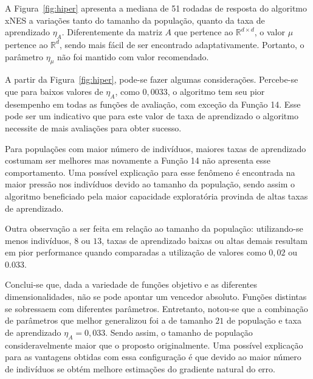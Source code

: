A Figura~\ref{fig:hiper} apresenta a mediana de 51 rodadas de resposta do algoritmo xNES a variações tanto do
tamanho da população, quanto da taxa de aprendizado $\eta_A$.
Diferentemente da matriz $A$ que pertence ao $\mathbb{R}^{d \times d}$, o valor $\mu$ pertence ao $\mathbb{R}^{d}$, sendo
mais fácil de ser encontrado adaptativamente.
Portanto, o parâmetro $\eta_{\mu}$ não foi mantido com valor recomendado.

A partir da Figura~\ref{fig:hiper}, pode-se fazer algumas considerações.
Percebe-se que para baixos valores de $\eta_A$, como $0,0033$, o algoritmo tem seu pior desempenho em todas as funções
de avaliação, com exceção da Função 14.
Esse pode ser um indicativo que para este valor de taxa de aprendizado o algoritmo necessite de mais avaliações para
obter sucesso.

Para populações com maior número de indivíduos, maiores taxas de aprendizado costumam ser melhores mas novamente a Função 14
não apresenta esse comportamento.
Uma possível explicação para esse fenômeno é encontrada na maior pressão nos indivíduos devido ao tamanho da população, sendo
assim o algoritmo beneficiado pela maior capacidade exploratória provinda de altas taxas de aprendizado.

Outra observação a ser feita em relação ao tamanho da população: utilizando-se menos indivíduos, $8$ ou $13$, taxas de
aprendizado baixas ou altas demais resultam em pior performance quando comparadas a utilização de valores como $0,02$ ou
$0.033$.

Conclui-se que, dada a variedade de funções objetivo e as diferentes dimensionalidades, não se pode apontar um vencedor absoluto.
Funções distintas se sobressaem com diferentes parâmetros.
Entretanto, notou-se que a combinação de parâmetros que melhor generalizou foi a de tamanho $21$ de população e taxa de
aprendizado $\eta_A = 0,033$.
Sendo assim, o tamanho de população consideravelmente maior que o proposto originalmente.
Uma possível explicação para as vantagens obtidas com essa configuração é que devido ao maior número de indivíduos se obtém
melhore estimações do gradiente natural do erro.


